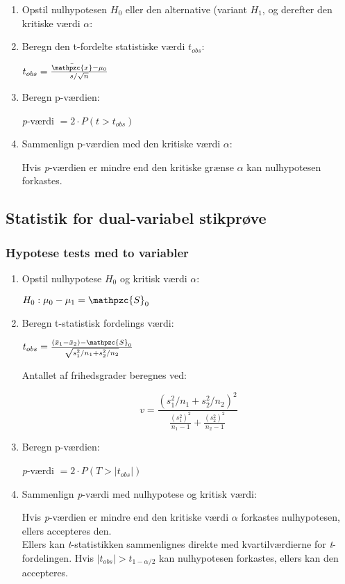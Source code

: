 \documentclass{article}
\newcommand{\mellemrum}{\vspace{2 ex}}
\newcommand{\cent}[1]{ \mellemrum \begin{center} #1\end{center} \mellemrum }
\newcommand{\script}[1]{\mathpzc{#1}}
\begin{document}
	\begin{enumerate}
		
		\item Opstil nulhypotesen $H_0$ eller den alternative (variant $H_1$, og derefter den kritiske værdi $\alpha$:
		\item Beregn den t-fordelte statistiske værdi $t_{obs}$:
		
		\cent{$ t_{obs} = \frac{\bar{\script{x}} - \mu_0}{s/\sqrt{n}} $}
		
		\item Beregn p-værdien:
		
		\cent{\textit{p}-værdi $ = 2 \cdot P(t > t_{obs}) $}
		\item Sammenlign p-værdien med den kritiske værdi $\alpha$:
		
		Hvis \textit{p}-værdien er mindre end den kritiske grænse $\alpha$ kan nulhypotesen forkastes.

	\end{enumerate}

	\subsection{Statistik for dual-variabel stikprøve}
	
	\subsubsection{Hypotese tests med to variabler}
	
	\begin{enumerate}
		\item Opstil nulhypotese $H_0$ og kritisk værdi $\alpha$:
		
		\cent{$ H_0 : \mu_0 - \mu_1 = \script{S}_0 $}
		
		\item Beregn t-statistisk fordelings værdi:
		
		\cent{$ t_{obs} = \frac{(\bar{x}_1 - \bar{x}_2) - \script{S}_0}{\sqrt{s_1^2/n_1 + s_2^2/n_2}} $}
		
		Antallet af frihedsgrader beregnes ved:
		
		\cent{$$ v = \frac{(s_1^2/n_1 + s_2^2/n_2)^2}{\frac{(s_1^2)^2}{n_1 - 1} + \frac{(s_2^2)^2}{n_2 - 1}} $$}
		
		\item Beregn p-værdien:
		
		\cent{\textit{p}-værdi  $ = 2 \cdot P(T >  |t_{obs}|)$}
		
		\item Sammenlign \textit{p}-værdi med nulhypotese og kritisk værdi:
		
		Hvis \textit{p}-værdien er mindre end den kritiske værdi $\alpha$ forkastes nulhypotesen, ellers accepteres den. \\
		
		Ellers kan \textit{t}-statistikken sammenlignes direkte med kvartilværdierne for \textit{t}-fordelingen. Hvis $|t_{obs}| > t_{1-\alpha/2}$ kan nulhypotesen forkastes, ellers kan den accepteres.
		
	\end{enumerate}
	
\end{document}
